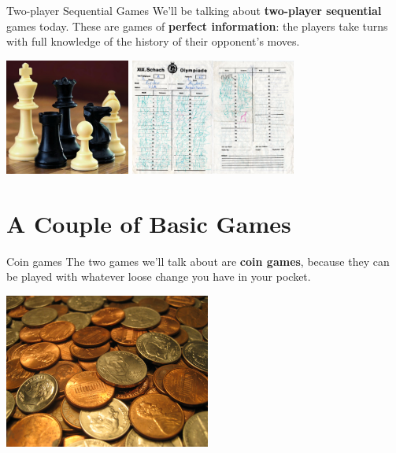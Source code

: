\documentclass{beamer}
\theoremstyle{theorem}
\theoremstyle{definition}
\newcommand{\<}{\langle}
\renewcommand{\>}{\rangle}
\newcommand{\term}[1]{\textbf{#1}}
\begin{document}
\begin{frame}{Two-player Sequential Games}
  We'll be talking about \term{two-player sequential} games today. These are
  games of \term{perfect information}: the players take turns with full
  knowledge of the history of their opponent's moves.

  \vspace{1em}

  \centerline{
    \includegraphics[height=1.5in]{chessPieces.jpg}
    \includegraphics[height=1.5in]{chessNotation.jpg}
  }
\end{frame}

\section{A Couple of Basic Games}

\begin{frame}{Coin games}
  The two games we'll talk about are \term{coin games}, because they can be
  played with whatever loose change you have in your pocket.

  \centerline{
    \includegraphics[height=2in]{coins.jpg}
  }
\end{frame}
\end{document}
